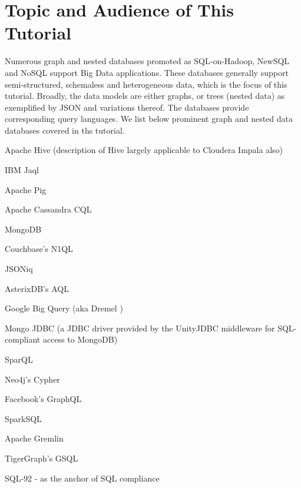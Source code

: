 
\section{Topic and Audience of This Tutorial}
Numerous graph and nested databases promoted as SQL-on-Hadoop, NewSQL and NoSQL support Big Data applications. These databases generally support semi-structured, schemaless and heterogeneous data, which is the focus of this tutorial. Broadly, the data models are either graphs, or trees (nested data) as exemplified by JSON and variations thereof. The databases provide corresponding query languages. We list below prominent graph and nested data databases covered in ths tutorial.


\begin{compact_enum}
\item Apache Hive \cite{hive-icde-2010} (description of Hive largely applicable to Cloudera Impala \cite{impala} also)
\item IBM Jaql \cite{jaql-pvldb-2011}
\item Apache Pig \cite{pig-sigmod-2008}
\item Apache Cassandra CQL \cite{cassandra-osr-2010}
\item MongoDB \cite{mongodb}
\item Couchbase's N1QL \cite{couchbase,couchbase-sigmod-2016}
\item JSONiq \cite{jsoniq-ieee-ic-2013}
\item AsterixDB's AQL \cite{asterixdb-dpd-2011-all-authors}
\item Google Big Query (aka Dremel \cite{dremel-pvldb-2010})
\item Mongo JDBC \cite{unityjdbc} (a JDBC driver provided by the UnityJDBC middleware for SQL-compliant access to MongoDB)
\item {}
\item SparQL \cite{sparql}
\item Neo4j's Cypher \cite{cypher}
\item Facebook's GraphQL \cite{graphql}
\item SparkSQL \cite{sparksql}
\item Apache Gremlin \cite{gremlin}
\item TigerGraph's GSQL \cite{gsql}
\item SQL-92 - as the anchor of SQL compliance
\end{compact_enum}


